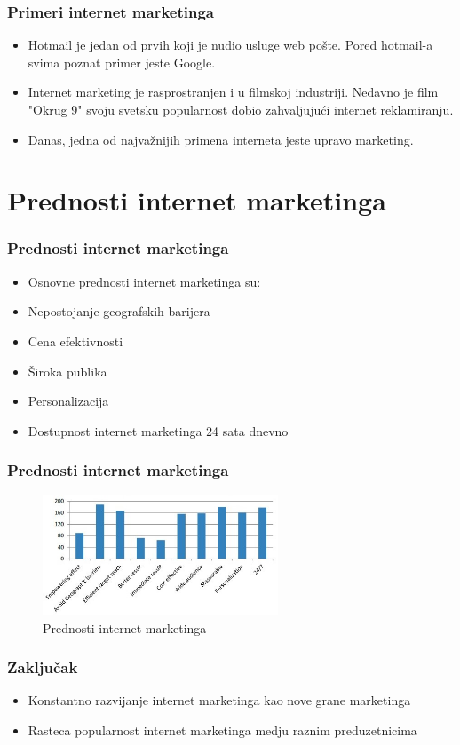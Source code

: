 \documentclass{beamer}
\begin{document}
\begin{frame}[fragile]\frametitle{Primeri internet marketinga}
	\begin{itemize}
		\item Hotmail je jedan od prvih koji je nudio usluge web pošte. Pored hotmail-a svima poznat primer jeste Google. 
		\item Internet marketing je rasprostranjen i u filmskoj industriji. Nedavno je film "Okrug 9" svoju svetsku popularnost dobio zahvaljujući internet reklamiranju.
        \item Danas, jedna od najvažnijih primena interneta jeste upravo marketing.
	\end{itemize}
\end{frame}

\section{Prednosti internet marketinga}
\begin{frame}[fragile]\frametitle{Prednosti internet marketinga}
	\begin{itemize}
	\item Osnovne prednosti internet marketinga su:
    \end{itemize}
    \begin{itemize}
      \item Nepostojanje geografskih barijera
     \item Cena efektivnosti
      \item Široka publika
       \item Personalizacija 
      \item Dostupnost internet marketinga 24 sata dnevno
	\end{itemize}
\end{frame}

\begin{frame}[fragile]\frametitle{Prednosti internet marketinga}
\begin{figure}[h!]
\begin{center}
\includegraphics[width=7cm]{slika.prednosti.marketinga.jpg}
\end{center}
\caption{Prednosti internet marketinga}
\label{fig:prednosti}
\end{figure}
\end{frame}
\begin{frame}[fragile]\frametitle{Zaključak}
	\begin{itemize}
		\item Konstantno razvijanje internet marketinga kao nove grane marketinga
        \item Rasteca popularnost internet marketinga medju raznim preduzetnicima
	\end{itemize}
\end{frame}
\end{document}
